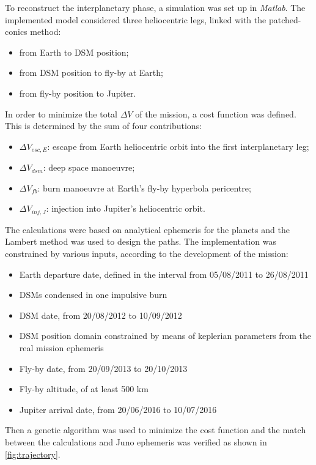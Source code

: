 To reconstruct the interplanetary phase, a simulation was set up in \textit{Matlab}. The implemented model considered three heliocentric legs, linked with the patched-conics method:
\begin{itemize}
    \item from Earth to DSM position;
    \item from DSM position to fly-by at Earth;
    \item from fly-by position to Jupiter.
\end{itemize}
In order to minimize the total $\Delta V$ of the mission, a cost function was defined. This is determined by the sum of four contributions:
\begin{itemize}
    \item $\Delta V_{esc,E}$: escape from Earth heliocentric orbit into the first interplanetary leg;
    \item $\Delta V_{dsm}$: deep space manoeuvre;
    \item $\Delta V_{fb}$: burn manoeuvre at Earth's fly-by hyperbola pericentre;
    \item $\Delta V_{inj,J}$: injection into Jupiter's heliocentric orbit.
\end{itemize}
The calculations were based on analytical ephemeris for the planets and the Lambert method was used to design the paths. The implementation was constrained by various inputs, according to the development of the mission:
\begin{itemize}
    \item Earth departure date, defined in the interval from 05/08/2011 to 26/08/2011
    \item DSMs condensed in one impulsive burn
    \item DSM date, from 20/08/2012 to 10/09/2012
    \item DSM position domain constrained by means of keplerian parameters from the real mission ephemeris
    \item Fly-by date, from 20/09/2013 to 20/10/2013 
    \item Fly-by altitude, of at least 500 km
    \item Jupiter arrival date, from 20/06/2016 to 10/07/2016
\end{itemize}
Then a genetic algorithm was used to minimize the cost function and the match between the calculations and Juno ephemeris was verified as shown in \autoref{fig:trajectory}.

